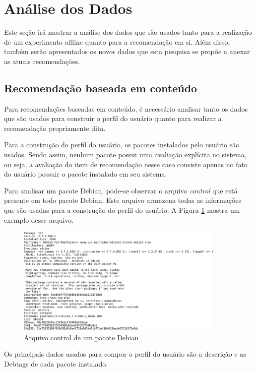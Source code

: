 \section{Análise dos Dados}

Este seção irá mostrar a análise dos dados que são usados tanto para a
realização de um experimento offline quanto para a recomendação em si. Além
disso, também serão apresentados os novos dados que esta pesquisa se propõe a
anexar as atuais recomendações.

\subsection{Recomendação baseada em conteúdo}

Para recomendações baseadas em conteúdo, é necessário analisar tanto os dados
que são usados para construir o perfil do usuário quanto para realizar a
recomendação propriamente dita.

Para a construção do perfil do usuário, os pacotes instalados pelo usuário são
usados. Sendo assim, nenhum pacote possui uma avaliação explícita no sistema,
ou seja, a avaliação do item de recomendação nesse caso consiste apenas no fato
do usuário possuir o pacote instalado em seu sistema.

Para analisar um pacote Debian, pode-se observar o arquivo \textit{control} que
está presente em todo pacote Debian. Este arquivo
armazena todas as informações que são usadas para a construção do perfil do
usuário. A Figura \ref{fig:control_pacote} mostra um exemplo desse arquivo.

\begin{figure}[h]
  \centering
  \includegraphics[width=0.9\textwidth]{figuras/control_pacote.eps}
  \caption{Arquivo control de um pacote Debian}
  \label{fig:control_pacote}
\end{figure}

Os principais dados usados para compor o perfil do usuário são a
descrição e as Debtags de cada pacote instalado.

